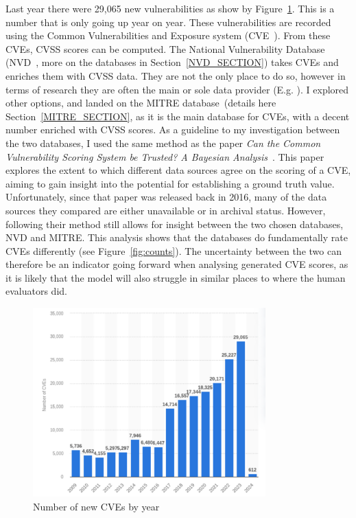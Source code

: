 \documentclass[12pt]{article}
\begin{document}
Last year there were 29,065 new vulnerabilities as show by Figure~\ref{fig:cve_year}. This is a
number that is only going up year on year. These vulnerabilities are recorded using the Common
Vulnerabilities and Exposure system (CVE~\cite{CVE}). From these CVEs, CVSS scores can be computed.
The National Vulnerability Database (NVD~\cite{NVD}, more on the databases in
Section~\ref{NVD_SECTION}) takes CVEs and enriches them with CVSS data. They are not the only place
to do so, however in terms of research they are often the main or sole data provider (E.g.\@
\cite{costa, nvd_example1, nvd_example2}).  I explored other options, and landed on the MITRE
database~\cite{MITRE}(details here Section~\ref{MITRE_SECTION}, as it is the main database for CVEs,
with a decent number enriched with CVSS scores. As a guideline to my investigation between the two
databases, I used the same method as the paper \textit{Can the Common Vulnerability Scoring System
	be Trusted? A Bayesian Analysis}~\cite{bayes}. This paper explores the extent to which different
data sources agree on the scoring of a CVE, aiming to gain insight into the potential for
establishing a ground truth value. Unfortunately, since that paper was released back in 2016, many
of the data sources they compared are either unavailable or in archival status. However, following
their method still allows for insight between the two chosen databases, NVD and MITRE. This analysis
shows that the databases do fundamentally rate CVEs differently (see Figure~\ref{fig:counts}). The
uncertainty between the two can therefore be an indicator going forward when analysing generated CVE
scores, as it is likely that the model will also struggle in similar places to where the human
evaluators did.


\begin{figure}[h] \centering
	\includegraphics[width=0.8\textwidth]{figures/cve_year.pdf}
	\caption{\label{fig:cve_year}Number of new CVEs by year}
\end{figure}
\end{document}
